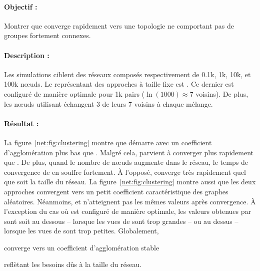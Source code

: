 \paragraph{Objectif :} Montrer que \SPRAY converge rapidement vers une topologie
ne comportant pas de groupes fortement connexes.

\paragraph{Description :} Les simulations ciblent des réseaux composés
respectivement de 0.1k, 1k, 10k, et 100k nœuds. Le représentant des approches à
taille fixe est \CYCLON. Ce dernier est configuré de manière optimale pour 1k
pairs ($\ln(1000)\approx 7$ voisins). De plus, les nœuds utilisant \CYCLON
échangent 3 de leurs 7 voisins à chaque mélange.

\paragraph{Résultat :} La figure~\ref{net:fig:clustering} montre que \CYCLON
démarre avec un coefficient d'agglomération plus bas que \SPRAY. Malgré cela,
\SPRAY parvient à converger plus rapidement que \CYCLON. De plus, quand le
nombre de nœuds augmente dans le réseau, le temps de convergence de \CYCLON en
souffre fortement. À l'opposé, \SPRAY converge très rapidement quel que soit la
taille du réseau. La figure~\ref{net:fig:clustering} montre aussi que les deux
approches convergent vers un petit coefficient caractéristique des graphes
aléatoires. Néanmoins, \CYCLON et \SPRAY n'atteignent pas les mêmes valeurs
après convergence. À l'exception du cas où \CYCLON est configuré de manière
optimale, les valeurs obtenues par \SPRAY sont soit au dessous -- lorsque les
vues de \CYCLON sont trop grandes -- ou au dessus -- lorsque les vues de \CYCLON
sont trop petites. Globalement, \SPRAY
\begin{inparaenum}[(i)]
\item converge vers un coefficient d'agglomération stable
\item reflètant les besoins dûs à la taille du réseau.
\end{inparaenum}
